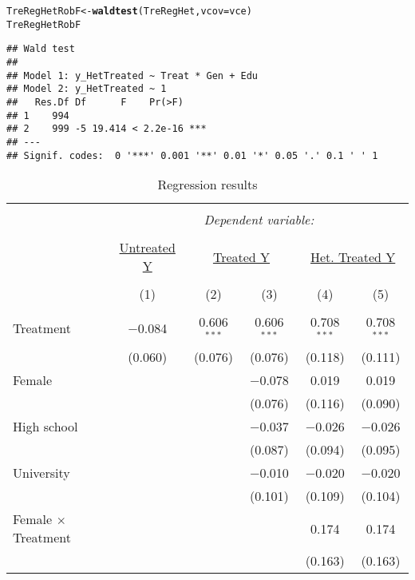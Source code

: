 \documentclass[11pt, a4paper]{article}\usepackage[]{graphicx}\usepackage[]{color}
\makeatletter
\newcommand{\hlstd}[1]{\textcolor[rgb]{0.345,0.345,0.345}{#1}}%
\newcommand{\hlkwb}[1]{\textcolor[rgb]{0.69,0.353,0.396}{#1}}%
\newcommand{\hlkwc}[1]{\textcolor[rgb]{0.333,0.667,0.333}{#1}}%
\newcommand{\hlkwd}[1]{\textcolor[rgb]{0.737,0.353,0.396}{\textbf{#1}}}%
\newenvironment{kframe}{%
 \def\at@end@of@kframe{}%
 \ifinner\ifhmode%
  \def\at@end@of@kframe{\end{minipage}}%
  \begin{minipage}{\columnwidth}%
 \fi\fi%
 \def\FrameCommand##1{\hskip\@totalleftmargin \hskip-\fboxsep
 \colorbox{shadecolor}{##1}\hskip-\fboxsep
     \hskip-\linewidth \hskip-\@totalleftmargin \hskip\columnwidth}%
 \MakeFramed {\advance\hsize-\width
   \@totalleftmargin\z@ \linewidth\hsize
   \@setminipage}}%
 {\par\unskip\endMakeFramed%
 \at@end@of@kframe}
\newenvironment{knitrout}{}{} %
\makeatother
\begin{document}
\begin{knitrout}
\begin{kframe}
\begin{alltt}
  \hlstd{TreRegHetRobF} \hlkwb{<-} \hlkwd{waldtest}\hlstd{(TreRegHet,} \hlkwc{vcov} \hlstd{= vce)}
  \hlstd{TreRegHetRobF}
\end{alltt}
\begin{verbatim}
## Wald test
## 
## Model 1: y_HetTreated ~ Treat * Gen + Edu
## Model 2: y_HetTreated ~ 1
##   Res.Df Df      F    Pr(>F)    
## 1    994                        
## 2    999 -5 19.414 < 2.2e-16 ***
## ---
## Signif. codes:  0 '***' 0.001 '**' 0.01 '*' 0.05 '.' 0.1 ' ' 1
\end{verbatim}
\end{kframe}
\end{knitrout}


\begin{table}[!htbp] \centering 
  \caption{Regression results} 
  \label{} 
\begin{tabular}{@{\extracolsep{5pt}}lccccc} 
\\[-1.8ex]\hline 
\hline \\[-1.8ex] 
 & \multicolumn{5}{c}{\textit{Dependent variable:}} \\ 
\cline{2-6} 
\\[-1.8ex] & \underline{Untreated Y} & \multicolumn{2}{c}{\underline{Treated Y}} & \multicolumn{2}{c}{\underline{Het. Treated Y}} \\ 
\\[-1.8ex] & (1) & (2) & (3) & (4) & (5)\\ 
\hline \\[-1.8ex] 
 Treatment & $-$0.084 & 0.606$^{***}$ & 0.606$^{***}$ & 0.708$^{***}$ & 0.708$^{***}$ \\ 
  & (0.060) & (0.076) & (0.076) & (0.118) & (0.111) \\ 
  Female &  &  & $-$0.078 & 0.019 & 0.019 \\ 
  &  &  & (0.076) & (0.116) & (0.090) \\ 
  High school &  &  & $-$0.037 & $-$0.026 & $-$0.026 \\ 
  &  &  & (0.087) & (0.094) & (0.095) \\ 
  University &  &  & $-$0.010 & $-$0.020 & $-$0.020 \\ 
  &  &  & (0.101) & (0.109) & (0.104) \\ 
  Female $\times$ Treatment &  &  &  & 0.174 & 0.174 \\ 
  &  &  &  & (0.163) & (0.163) \\ 

\end{tabular}
\end{table}
\end{document}
